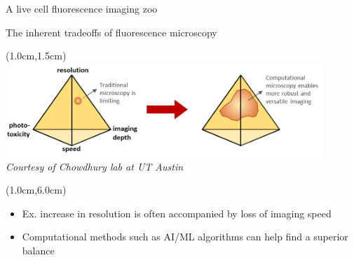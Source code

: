 \documentclass{beamer}					%
\begin{document}
\begin{frame}{A live cell fluorescence imaging zoo}

\end{frame}

\begin{frame}{The inherent tradeoffs of fluorescence microscopy}
\begin{textblock*}{12cm}(1.0cm,1.5cm)
\includegraphics[width=12cm]{../../postdoc/sartorius/media/Tradeoff.png}
\emph{Courtesy of Chowdhury lab at UT Austin}
\end{textblock*}
\begin{textblock*}{12cm}(1.0cm,6.0cm)
\begin{itemize}
\item Ex. increase in resolution is often accompanied by loss of imaging speed
\item Computational methods such as AI/ML algorithms can help find a superior balance
\end{itemize}
\end{textblock*}
\end{frame}
\end{document}

